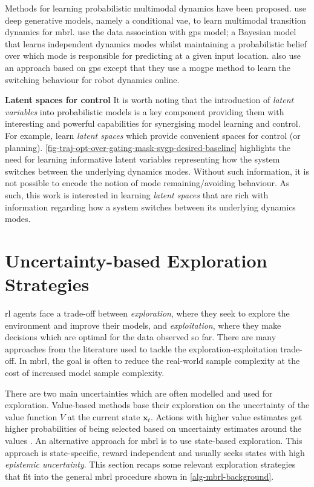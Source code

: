 \documentclass{mimosis-class/mimosis}
\numberwithin{equation}{chapter}
\newcommand{\state}{\ensuremath{\mathbf{x}}}
\begin{document}
Methods for learning probabilistic multimodal dynamics have been proposed.
\cite{moerlandLearning2017} use deep generative models, namely a conditional \acrfull{vae},
to learn multimodal transition dynamics for \acrshort{mbrl}.
\cite{kaiserBayesian2020} use the data association with \acrshort{gps} model;
a Bayesian model that learns independent dynamics modes whilst maintaining a
probabilistic belief over which mode is responsible for predicting at a given input location.
\cite{mckinnonLearning2017} also use an approach based on \acrshort{gps} except that they use a
\acrfull{mogpe} method to learn the switching behaviour for robot dynamics online.

\textbf{Latent spaces for control}
It is worth noting that the introduction of \emph{latent variables} into probabilistic models
is a key component providing them with interesting and powerful capabilities for synergising model learning and control.
For example, \cite{hafnerLearning2019,rybkinModelBased2021} learn \emph{latent spaces} which provide
convenient spaces for control (or planning).
\cref{fig-traj-opt-over-gating-mask-svgp-desired-baseline} highlights the need for learning
informative latent variables representing how the system switches between the underlying dynamics modes.
Without such information, it is not possible to encode the notion of mode remaining/avoiding behaviour.
As such, this work is interested in learning \emph{latent spaces}
that are rich with information regarding how a system switches between its underlying dynamics modes.

\section{Uncertainty-based Exploration Strategies \label{sec-unc-exploration}}
\label{sec:orgd6a43c2}
\acrfull{rl} agents face a trade-off between \emph{exploration}, where they seek to explore the environment and improve
their models, and \emph{exploitation}, where they make decisions which are optimal for the data observed so far.
There are many approaches from the literature used to tackle the exploration-exploitation trade-off.
In \acrshort{mbrl}, the goal is often to reduce the real-world sample complexity at the cost of increased
model sample complexity.

There are two main uncertainties which are often modelled and used for exploration.
Value-based methods base their exploration on the uncertainty of the value function \(V\) at the current state \(\state_t\).
Actions with higher value estimates get higher probabilities of being selected based on
uncertainty estimates around the values \citep{moerlandEfficient2017,auerUsing2002}.
An alternative approach for \acrshort{mbrl} is to use state-based exploration.
This approach is state-specific, reward independent and usually seeks states with high \emph{epistemic uncertainty}.
This section recaps some relevant exploration strategies that fit into the general
\acrshort{mbrl} procedure shown in \cref{alg-mbrl-background}.
\end{document}
